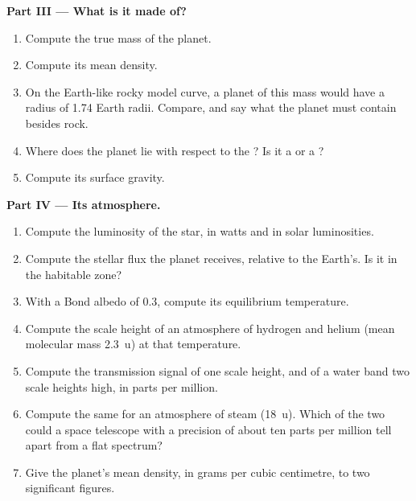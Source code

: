\begin{problem}
\medskip\noindent\textbf{Part III --- What is it made of?}
\begin{enumerate}[resume]
\item Compute the true mass of the planet.
\item Compute its mean density.
\item On the Earth-like rocky model curve, a planet of this mass would
  have a radius of 1.74 Earth radii. Compare, and say what the planet
  must contain besides rock.
\item Where does the planet lie with respect to the ? Is it
  a  or a ?
\item Compute its surface gravity.
\end{enumerate}

\medskip\noindent\textbf{Part IV --- Its atmosphere.}
\begin{enumerate}[resume]
\item Compute the luminosity of the star, in watts and in solar
  luminosities.
\item Compute the stellar flux the planet receives, relative to the
  Earth's. Is it in the habitable zone?
\item With a Bond albedo of 0.3, compute its equilibrium temperature.
\item Compute the scale height of an atmosphere of hydrogen and helium
  (mean molecular mass \qty{2.3}{u}) at that temperature.
\item Compute the transmission signal of one scale height, and of a
  water band two scale heights high, in parts per million.
\item Compute the same for an atmosphere of steam (\qty{18}{u}). Which of
  the two could a space telescope with a precision of about ten parts per
  million tell apart from a flat spectrum?
\item Give the planet's mean density, in grams per cubic centimetre, to
  two significant figures.
\end{enumerate}
\end{problem}
